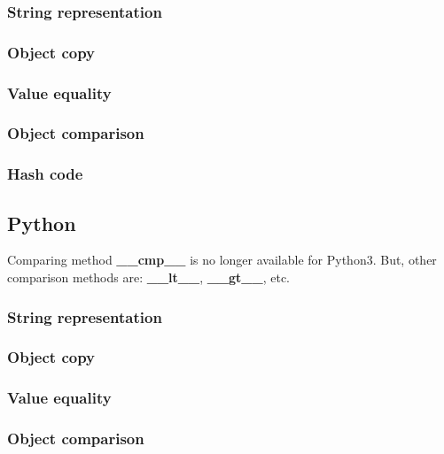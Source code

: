 \documentclass{KodeBook}
\begin{document}
\subsubsection{String representation}

\subsubsection{Object copy}

\subsubsection{Value equality}

\subsubsection{Object comparison}

\subsubsection{Hash code}

\subsection{Python}



Comparing method \textbf{\_\_cmp\_\_} is no longer available for Python3. 
But, other comparison methods are: \textbf{\_\_lt\_\_}, \textbf{\_\_gt\_\_}, etc.

\subsubsection{String representation}

\subsubsection{Object copy}

\subsubsection{Value equality}

\subsubsection{Object comparison}
\end{document}
